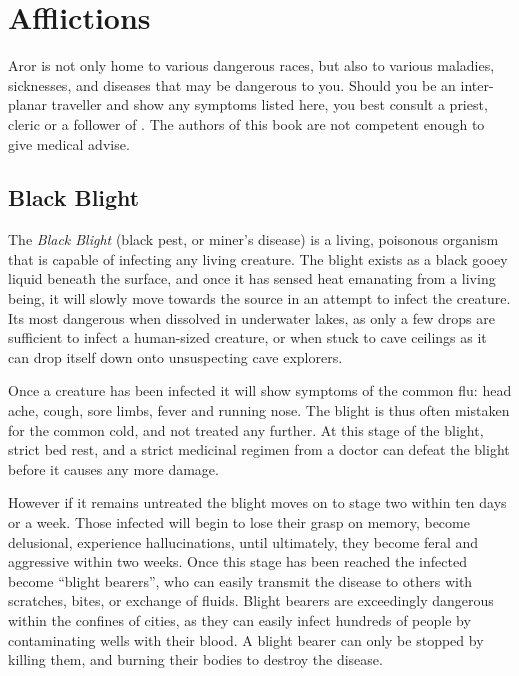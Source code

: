 \section{Afflictions}
\label{sec:Afflictions}

Aror is not only home to various dangerous races, but also to various
maladies, sicknesses, and diseases that may be dangerous to you. Should you be
an inter-planar traveller and show any symptoms listed here, you best consult
a priest, cleric or a follower of . The authors of this
book are not competent enough to give medical advise.

\subsection{Black Blight}
\label{sec:Black Blight}

The \emph{Black Blight} (black pest, or miner's disease) is a living,
poisonous organism that is capable of infecting any living creature. The
blight exists as a black gooey liquid beneath the surface, and once it has
sensed heat emanating from a living being, it will slowly move towards the
source in an attempt to infect the creature. Its most dangerous when dissolved
in underwater lakes, as only a few drops are sufficient to infect a
human-sized creature, or when stuck to cave ceilings as it can drop itself
down onto unsuspecting cave explorers.

Once a creature has been infected it will show symptoms of the common flu:
head ache, cough, sore limbs, fever and running nose. The blight is thus
often mistaken for the common cold, and not treated any further. At this
stage of the blight, strict bed rest, and a strict medicinal regimen from
a doctor can defeat the blight before it causes any more damage.

However if it remains untreated the blight moves on to stage two within ten
days or a week. Those infected will begin to lose their grasp on memory,
become delusional, experience hallucinations, until ultimately, they become
feral and aggressive within two weeks. Once this stage has been reached the
infected become ``blight bearers'', who can easily transmit the disease to
others with scratches, bites, or exchange of fluids. Blight bearers are
exceedingly dangerous within the confines of cities, as they can easily infect
hundreds of people by contaminating wells with their blood. A blight bearer
can only be stopped by killing them, and burning their bodies to destroy
the disease.

